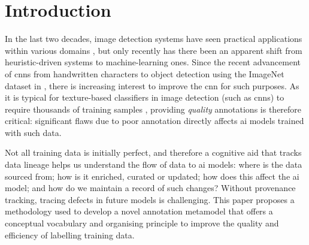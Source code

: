 \section{Introduction}

In the last two decades, image detection systems have seen practical applications within various domains \citep{Tsai:2010cn,Girod:2011gw,Takacs:2008cg,Sivic:2003tj,Lowe:2004kp,Bay:2008ud,Jin:2016jd,Smeulders:2000tx}, but only recently has there been an apparent shift from heuristic-driven systems to machine-learning ones. Since the recent advancement of \glspl{cnn} from handwritten characters \citep{Lecun:1998hy} to object detection \citep{Krizhevsky:2012wl} using the ImageNet dataset in \citeyear{Krizhevsky:2012wl}, there is increasing interest to improve the \gls{cnn} \cite{Girshick:2014jx,Girshick:2015vr,Ren:2017ug,He:2017ud} for such purposes. As it is typical for texture-based classifiers in image detection (such as \glspl{cnn}) to require thousands of training samples \cite{Shivakumara:2011dn,Chen:2004ux}, providing \textit{quality} annotations is therefore critical: significant flaws due to poor annotation directly affects \gls{ai} models trained with such data.

Not all training data is initially perfect, and therefore a cognitive aid that tracks data lineage helps us understand the flow of data to \gls{ai} models: where is the data sourced from; how is it enriched, curated or updated; how does this affect the \gls{ai} model; and how do we maintain a record of such changes? Without provenance tracking, tracing defects in future models is challenging. This paper proposes a methodology used to develop a novel annotation metamodel that offers a conceptual vocabulary and organising principle to improve the quality and efficiency of labelling training data. 